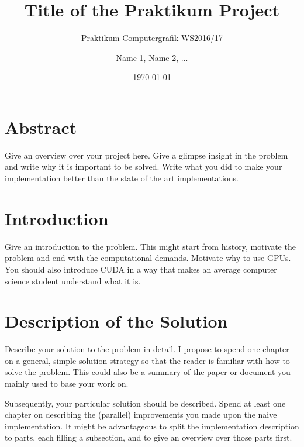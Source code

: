 \documentclass{utue} %
\title{Title of the Praktikum Project}
\author{Name 1, Name 2, ...}
\date{\today}
\subtitle{Praktikum Computergrafik WS2016/17}
\begin{document}

\maketitle

\section*{Abstract}

Give an overview over your project here. Give a glimpse insight in the problem and write why it is important to be solved. Write what you did to make your implementation better than the state of the art implementations.


\section{Introduction}

Give an introduction to the problem. This might start from history, motivate the problem and end with the computational demands. Motivate why to use GPUs. You should also introduce CUDA in a way that makes an average computer science student understand what it is.


\section{Description of the Solution}

Describe your solution to the problem in detail. I propose to spend one chapter on a general, simple solution strategy so that the reader is familiar with how to solve the problem. This could also be a summary of the paper or document you mainly used to base your work on.

Subsequently, your particular solution should be described. Spend at least one chapter on describing the (parallel) improvements you made upon the naive implementation. It might be advantageous to split the implementation description to parts, each filling a subsection, and to give an overview over those parts first.
\end{document}
